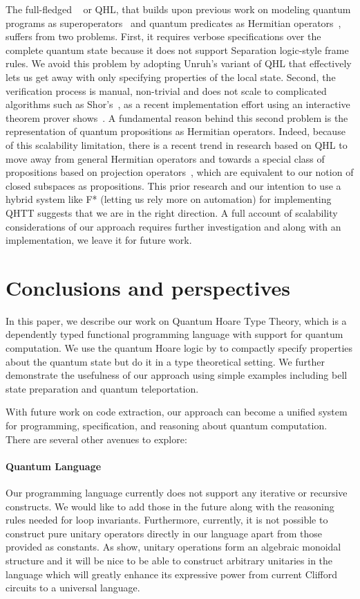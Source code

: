 The full-fledged ~\parencite{floydhoare2012} or QHL, that builds upon previous work on modeling quantum programs as superoperators~\parencite{Selinger2004} and quantum predicates as Hermitian operators~\parencite{dhondt2006}, suffers from two problems. First, it requires verbose specifications over the complete quantum state because it does not support Separation logic-style frame rules. We avoid this problem by adopting Unruh's variant of QHL that effectively lets us get away with only specifying properties of the local state. Second, the verification process is manual, non-trivial and does not scale to complicated algorithms such as Shor's~\parencite*{shor94}, as a recent implementation effort using an interactive theorem prover shows~\parencite{liu2019}. A fundamental reason behind this second problem is the representation of quantum propositions as Hermitian operators. Indeed, because of this scalability limitation, there is a recent trend in research based on QHL to move away from general Hermitian operators and towards a special class of propositions based on projection operators~\parencite{aqhl2019,Li2020}, which are equivalent to our notion of closed subspaces as propositions. This prior research and our intention to use a hybrid system like F* (letting us rely more on automation) for implementing QHTT suggests that we are in the right direction. A full account of scalability considerations of our approach requires further investigation and along with an implementation, we leave it for future work.

\section{Conclusions and perspectives}
\label{sec:conclusion}
In this paper, we describe our work on Quantum Hoare Type Theory, which is a dependently typed functional programming language with support for quantum computation. We use the quantum Hoare logic by \textcite{unruh2019} to compactly specify properties about the quantum state but do it in a type theoretical setting. We further demonstrate the usefulness of our approach using simple examples including bell state preparation and quantum teleportation.

With future work on code extraction, our approach can become a unified system for programming, specification, and reasoning about quantum computation. There are several other avenues to explore:

\paragraph{Quantum Language} Our programming language currently does not support any iterative or recursive constructs. We would like to add those in the future along with the reasoning rules needed for loop invariants. Furthermore, currently, it is not possible to construct pure unitary operators directly in our language apart from those provided as constants. As \textcite{qio} show, unitary operations form an algebraic monoidal structure and it will be nice to be able to construct arbitrary unitaries in the language which will greatly enhance its expressive power from current Clifford circuits to a universal language.

